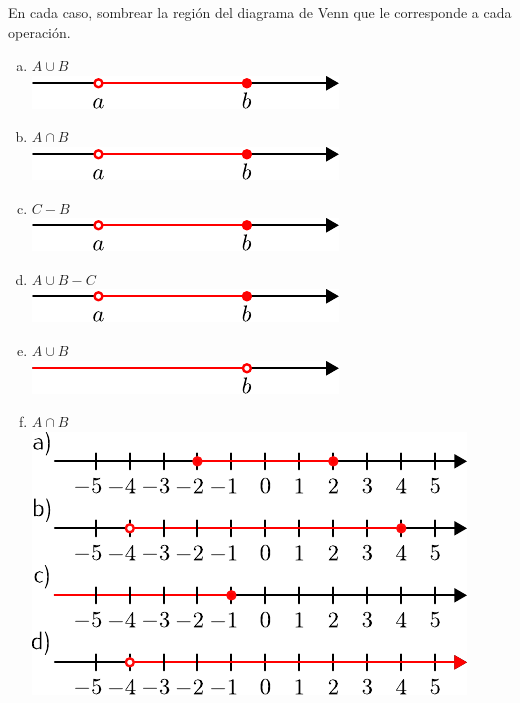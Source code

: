 \documentclass[11pt]{article}
\begin{document}
\begin{exercise}
En cada caso, sombrear la región del diagrama de Venn que le corresponde a cada operación.
\begin{multicols}{3}
    \begin{enumerate}[a)]
        \item $A \cup B$ \\
            \includegraphics[scale=0.7]{figs/fig-07.pdf}
        \item $A \cap B$ \\
            \includegraphics[scale=0.7]{figs/fig-07.pdf}
        \item $C - B$\\
            \includegraphics[scale=0.7]{figs/fig-07.pdf}
        \item $A \cup B - C$\\
            \includegraphics[scale=0.7]{figs/fig-07.pdf}
        \item $A \cup B$\\
            \includegraphics[scale=0.7]{figs/fig-08.pdf}
        \item $A \cap B$\\
            \includegraphics[scale=0.7]{figs/fig-09.pdf}
    \end{enumerate}
\end{multicols}
\end{exercise}
\end{document}
